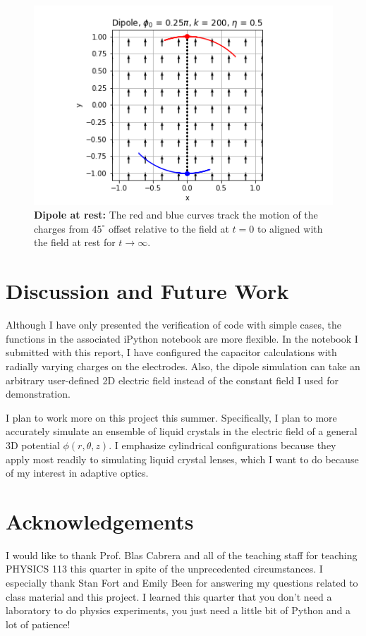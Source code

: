 \documentclass[twocolumn,aps,prl]{revtex4-1} %
\begin{document}
\begin{figure}
	\centering    
    \includegraphics[width=\columnwidth]{dipole_rest.png}
    \caption{\textbf{Dipole at rest:} The red and blue curves track the motion of the charges from $45^{\circ}$ offset relative to the field at $t=0$ to aligned with the field at rest for $t\to \infty$. }
    \label{fig:dipole}
\end{figure}

\section{Discussion and Future Work}

Although I have only presented the verification of code with simple cases, the functions in the associated iPython notebook are more flexible.  In the notebook I submitted with this report, I have configured the capacitor calculations with radially varying charges on the electrodes.  Also, the dipole simulation can take an arbitrary user-defined 2D electric field instead of the constant field I used for demonstration.

I plan to work more on this project this summer.  Specifically, I plan to more accurately simulate an ensemble of liquid crystals in the electric field of a general 3D potential $\phi(r,\theta,z)$.  I emphasize cylindrical configurations because they apply most readily to simulating liquid crystal lenses, which I want to do because of my interest in adaptive optics.

\section{Acknowledgements}
I would like to thank Prof. Blas Cabrera and all of the teaching staff for teaching PHYSICS 113 this quarter in spite of the unprecedented circumstances.  I especially thank Stan Fort and Emily Been for answering my questions related to class material and this project.  I learned this quarter that you don't need a laboratory to do physics experiments, you just need a little bit of Python and a lot of patience!



\end{document}
